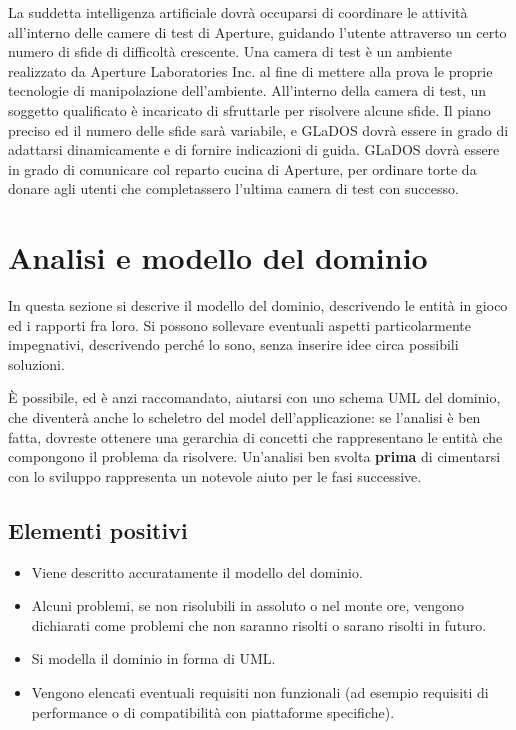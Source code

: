 \documentclass[a4paper,12pt]{report}
\begin{document}
La suddetta intelligenza artificiale dovrà occuparsi di coordinare le attività all'interno delle camere di test di Aperture, guidando l'utente attraverso un certo numero di sfide di difficoltà crescente.
%
Una camera di test è un ambiente realizzato da Aperture Laboratories Inc. al fine di mettere alla prova le proprie tecnologie di manipolazione dell'ambiente.
%
All'interno della camera di test, un soggetto qualificato è incaricato di sfruttarle per risolvere alcune sfide.
%
Il piano preciso ed il numero delle sfide sarà variabile, e GLaDOS dovrà essere in grado di adattarsi dinamicamente e di fornire indicazioni di guida.
%
GLaDOS dovrà essere in grado di comunicare col reparto cucina di Aperture, per ordinare torte da donare agli utenti che completassero l'ultima camera di test con successo.

\section{Analisi e modello del dominio}

In questa sezione si descrive il modello del dominio, descrivendo le entità in gioco ed i rapporti fra loro.
%
Si possono sollevare eventuali aspetti particolarmente impegnativi, descrivendo perché lo sono, senza inserire idee circa possibili soluzioni.

È possibile, ed è anzi raccomandato, aiutarsi con uno schema UML del dominio, che diventerà anche lo scheletro del model dell'applicazione: se l'analisi è ben fatta, dovreste ottenere una gerarchia di concetti che rappresentano le entità che compongono il problema da risolvere.
%
Un'analisi ben svolta \textbf{prima} di cimentarsi con lo sviluppo rappresenta un notevole aiuto per le fasi successive.

\subsection*{Elementi positivi}
\begin{itemize}
	\item Viene descritto accuratamente il modello del dominio.
	\item Alcuni problemi, se non risolubili in assoluto o nel monte ore, vengono dichiarati come problemi che non saranno risolti o sarano risolti in futuro.
	\item Si modella il dominio in forma di UML.
	\item Vengono elencati eventuali requisiti non funzionali (ad esempio requisiti di performance o di compatibilità con piattaforme specifiche).
\end{itemize}
\end{document}
